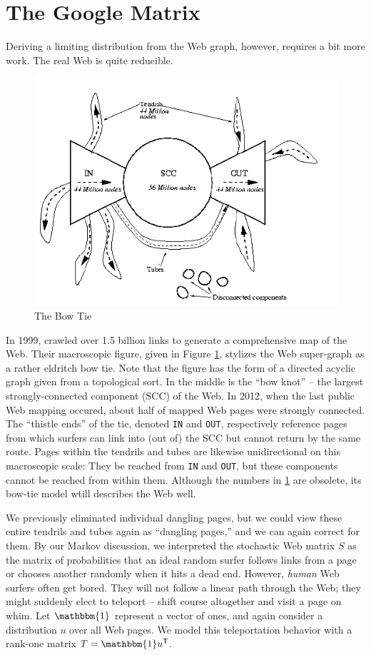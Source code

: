\documentclass[11pt,letterpaper]{amsart}
\newcommand{\transpose}[1]{#1^{\mathsf{T}}}
\begin{document}
\section{The Google Matrix}
Deriving a limiting distribution from the Web graph, however, requires a bit
more work. The real Web is quite reducible.
\begin{figure}
  \centering
  \includegraphics[scale=0.6]{bow-tie}
  \caption{The Bow Tie \cite{broderGraphStructureWeb}}
  \label{fig:bow-tie}
\end{figure}
In 1999, \cite{broderGraphStructureWeb} crawled over 1.5 billion links to
generate a comprehensive map of the Web. Their macroscopic figure, given in
Figure \ref{fig:bow-tie}, stylizes the Web super-graph as a rather eldritch bow
tie. Note that the figure has the form of a directed acyclic graph given from a
topological sort. In the middle is the ``bow knot'' -- the largest
strongly-connected component (SCC) of the Web. In 2012, when the last public Web
mapping occured, about half of mapped Web pages were strongly connected. The
``thistle ends'' of the tie, denoted \texttt{IN} and \texttt{OUT}, respectively
reference pages from which surfers can link into (out of) the SCC but cannot
return by the same route. Pages within the tendrils and tubes are likewise
unidirectional on this macroscopic scale: They be reached from \texttt{IN} and
\texttt{OUT}, but these components cannot be reached from within them. Although
the numbers in \ref{fig:bow-tie} are obsolete, its bow-tie model wtill describes
the Web well.

We previously eliminated individual dangling pages, but we could view these
entire tendrils and tubes again as ``dangling pages,'' and we can again correct
for them. By our Markov discussion, we interpreted the stochastic Web matrix $S$
as the matrix of probabilities that an ideal random surfer follows links from a
page or chooses another randomly when it hits a dead end. However,
\textit{human} Web surfers often get bored. They will not follow a linear path
through the Web; they might suddenly elect to teleport -- shift course
altogether and visit a page on whim. Let $\mathbbm{1}$ represent a vector of
ones, and again consider a distribution $u$ over all Web pages. We model this
teleportation behavior with a rank-one matrix $T = \mathbbm{1}\transpose{u}$.
\end{document}
